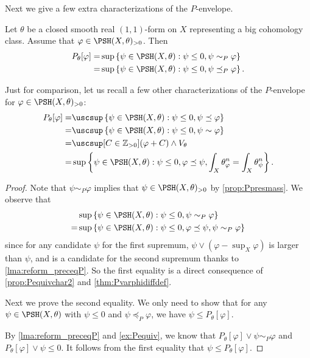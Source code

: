 Next we give a few extra characterizations of the $P$-envelope.
\begin{corollary}\label{cor:Pvarphidef3}
    Let $\theta$ be a closed smooth real $(1,1)$-form on $X$ representing a big cohomology class.
    Assume that $\varphi\in \PSH(X,\theta)_{>0}$. Then
    \[
        \begin{aligned}
        P_{\theta}[\varphi]=&\sup\left\{ \psi\in \PSH(X,\theta): \psi\leq 0, \psi\sim_P \varphi \right\}\\
        =&  \sup\left\{ \psi\in \PSH(X,\theta): \psi\leq 0, \psi\preceq_P \varphi \right\}.
        \end{aligned}
    \]
\end{corollary}
Just for comparison, let us recall a few other characterizations of the $P$-envelope for $\varphi\in \PSH(X,\theta)_{>0}$:
\[
\begin{aligned}
    P_{\theta}[\varphi]=&\uscsup\left\{ \psi\in \PSH(X,\theta):\psi\leq 0,\psi\preceq \varphi \right\}\\
    =&\uscsup\left\{ \psi\in \PSH(X,\theta):\psi\leq 0,\psi\sim \varphi \right\}\\
    =&\uscsup[C\in \mathbb{Z}_{>0}] (\varphi+C)\land V_{\theta}\\
    =& \sup\left\{\psi\in \PSH(X,\theta): \psi\leq 0,\varphi\preceq \psi, \int_X \theta_{\varphi}^n=\int_X \theta_{\psi}^n\right\}.
\end{aligned}
\]
\begin{proof}
    Note that $\psi\sim_P \varphi$ implies that $\psi\in \PSH(X,\theta)_{>0}$ by \cref{prop:Ppresmass}. We observe that
    \[
    \begin{split}
    &\sup\left\{ \psi\in \PSH(X,\theta): \psi\leq 0, \psi\sim_P \varphi \right\}\\=&\sup\left\{ \psi\in \PSH(X,\theta): \psi\leq 0, \varphi\preceq \psi, \psi\sim_P \varphi \right\}
    \end{split}
    \]
    since for any candidate $\psi$ for the first supremum, $\psi \lor (\varphi-\sup_X \varphi)$ is larger than $\psi$, and is a candidate for the second supremum thanks to \cref{lma:reform_preceqP}.
    So the first equality is a direct consequence of \cref{prop:Pequivchar2} and \cref{thm:Pvarphidiffdef}.

    Next we prove the second equality. We only need to show that for any $\psi\in \PSH(X,\theta)$ with $\psi\leq 0$ and $\psi\preceq_P \varphi$, we have $\psi\leq P_{\theta}[\varphi]$.

    By \cref{lma:reform_preceqP} and \cref{ex:Pequiv}, we know that $P_{\theta}[\varphi]\lor \psi\sim_P \varphi$ and $P_{\theta}[\varphi]\lor \psi\leq 0$. It follows from the first equality that $\psi\leq P_{\theta}[\varphi]$.
\end{proof}

